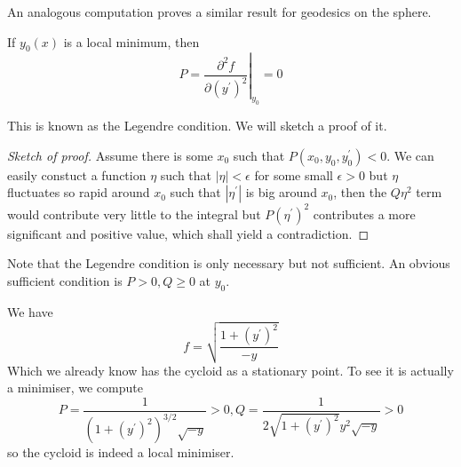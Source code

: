 \documentclass{article}
\begin{document}
An analogous computation proves a similar result for geodesics on the sphere.
\begin{proposition}
    If $y_0(x)$ is a local minimum, then
    $$P=\left.\frac{\partial^2 f}{\partial (y^\prime)^2}\right|_{y_0}=0$$
\end{proposition}
This is known as the Legendre condition.
We will sketch a proof of it.
\begin{proof}[Sketch of proof]
    Assume there is some $x_0$ such that $P(x_0,y_0,y_0^\prime)<0$.
    We can easily constuct a function $\eta$ such that $|\eta|<\epsilon$ for some small $\epsilon>0$ but $\eta$ fluctuates so rapid around $x_0$ such that $|\eta^\prime|$ is big around $x_0$, then the $Q\eta^2$ term would contribute very little to the integral but $P(\eta^\prime)^2$ contributes a more significant and positive value, which shall yield a contradiction.
\end{proof}
Note that the Legendre condition is only necessary but not sufficient.
An obvious sufficient condition is $P>0,Q\ge 0$ at $y_0$.
\begin{example}
    We have
    $$f=\sqrt{\frac{1+(y^\prime)^2}{-y}}$$
    Which we already know has the cycloid as a stationary point.
    To see it is actually a minimiser, we compute
    $$P=\frac{1}{(1+(y^\prime)^2)^{3/2}\sqrt{-y}}>0,Q=\frac{1}{2\sqrt{1+(y^\prime)^2}y^2\sqrt{-y}}>0$$
    so the cycloid is indeed a local minimiser.
\end{example}
\end{document}
